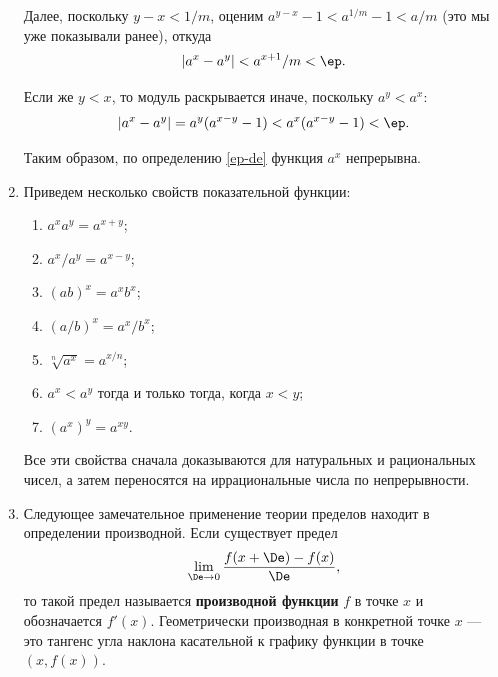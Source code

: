 \begin{enumerate}
Далее, поскольку $y-x<1/m$, оценим $a^{y-x}-1<a^{1/m}-1<a/m$ (это мы уже показывали ранее), откуда
$$
|a^x-a^y|<a^{x+1}/m<\ep.
$$

Если же $y<x$, то модуль раскрывается иначе, поскольку $a^y<a^x$:
$$
|a^x-a^y|=a^y(a^{x-y}-1)<a^x(a^{x-y}-1)<\ep.
$$

Таким образом, по определению \eqref{ep-de} функция $a^x$ непрерывна.





\item Приведем несколько свойств показательной функции:
\begin{enumerate}[\bf Pow1]
\item $a^xa^y = a^{x+y}$;
\item $a^x/a^y=a^{x-y}$;
\item $(ab)^x = a^x b^x$;
\item $(a/b)^x = a^x/b^x$;
\item $\sqrt[n]{a^x}=a^{x/n}$;
\item $a^x<a^y$ тогда и только тогда, когда $x<y$;
\item $(a^x)^y = a^{xy}$.
\end{enumerate}
Все эти свойства сначала доказываются для натуральных и рациональных чисел, а затем переносятся на иррациональные числа по непрерывности.

\item Следующее замечательное применение теории пределов находит в определении производной. Если существует предел
$$
\lim_{\De\to 0}\frac{f(x+\De)-f(x)}{\De},
$$
то такой предел называется \textbf{производной функции} $f$ в точке $x$ и обозначается $f'(x)$. Геометрически производная в конкретной точке $x$ --- это тангенс угла наклона касательной к графику функции в точке $(x,f(x))$.


\end{enumerate}
